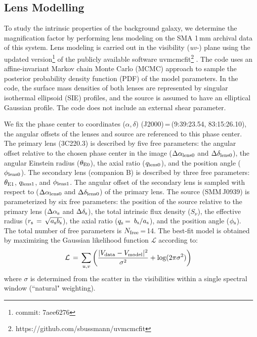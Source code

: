 \documentclass[twocolumn,apj,numberedappendix]{emulateapj}
\begin{document}
\subsection{Lens Modelling} \label{sec:Lens} 
To study the intrinsic properties of the background galaxy, we determine the magnification factor by performing
lens modeling on the SMA 1\,mm archival data of this system. Lens modeling is carried out in the visibility
({\it uv-}) plane using the updated version\footnote{commit: 7aee6276} of the publicly available software {\sc uvmcmcfit}\footnote{https://github.com/sbussmann/uvmcmcfit}
\citep{Bussmann15a}. The code uses an affine-invariant Markov chain Monte Carlo (MCMC) approach to sample the posterior
probability density function (PDF) of the model parameters. In the code, the surface mass densities of both
lenses are represented by singular isothermal ellipsoid (SIE) profiles, and the source is assumed to have an
elliptical Gaussian profile. The code does not include an external shear parameter.

We fix the phase center to coordinates ($\alpha$,\,$\delta$)\,\,(J2000)\,=\,(9:39:23.54,\,\,83:15:26.10), the
angular offsets of the lenses and source are referenced to this phase center. The primary lens (3C220.3) is
described by five free parameters: the angular offset relative to
the chosen phase center in the image ($\Delta \alpha_{\rm
lens0}$ and $\Delta \delta_{\rm lens0}$), the angular Einstein radius ($\theta_{\rm E0}$), the
axial ratio ($q_{\rm lens0}$), and the position angle ($\phi_{\rm lens0}$). The secondary lens (companion B) is
described by three free parameters: $\theta_{\rm E1}$, $q_{\rm lens1}$, and $\phi_{\rm lens1}$. The angular offset
of the secondary
lens is sampled with respect to ($\Delta \alpha_{\rm lens0}$ and $\Delta \delta_{\rm lens0}$) of
the primary lens.
The source (SMM\,J0939) is parameterized by
six free parameters: the position of the source relative to the
primary lens ($\Delta \alpha_{\rm s}$ and $\Delta
\delta_{\rm s}$), the total intrinsic flux density ($S_\nu$), the
effective radius ($r_{\rm s}\,=\,\sqrt{a_{\rm s} b_{\rm s}}$), the axial
ratio ($q_{\rm s}$\,=\, $b_{\rm s}/a_{\rm s}$), and the position angle
($\phi_{\rm s}$).
The total number of free parameters is $N_{\rm free}$\,=\,14. The best-fit model is obtained by maximizing the
Gaussian likelihood function $ \mathcal{L} $ according to:
\begin{equation}
    \mathcal{L}\,=\,\sum_{u, v}\left( \frac{|V_{\rm data} - V_{\rm
    model}|^2}{\sigma^2} + {\rm log}(2 \pi \sigma^2) \right)
\end{equation}
\noindent where $\sigma$ is determined from the scatter in the visibilities within a
single spectral window (``natural" weighting).
\end{document}
